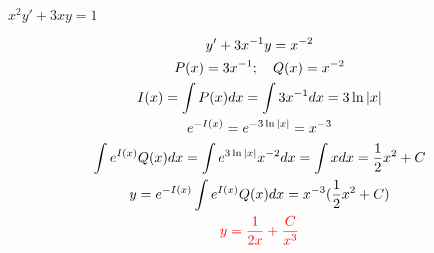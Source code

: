 \item [2.] $x^2y'+3xy=1$

\textcolor{blue}{
    \begin{gather*}
        y'+3x^{-1}y=x^{-2}\\
        P(x)=3x^{-1}; \quad Q(x)=x^{-2}\\
        I(x)=\int P(x)dx = \int 3x^{-1}dx=3\ln|x|\\
        e^{-I(x)}=e^{-3\ln|x|}=x^{-3}\\
        \int e^{I(x)}Q(x)dx=\int e^{3\ln|x|}x^{-2}dx=\int xdx=\frac{1}{2}x^2+C\\
        y=e^{-I(x)}\int e^{I(x)}Q(x)dx=x^{-3}(\frac{1}{2}x^2+C)\\
        \textcolor{red}{
        y=\frac{1}{2x}+\frac{C}{x^3}   
        }
    \end{gather*}
}